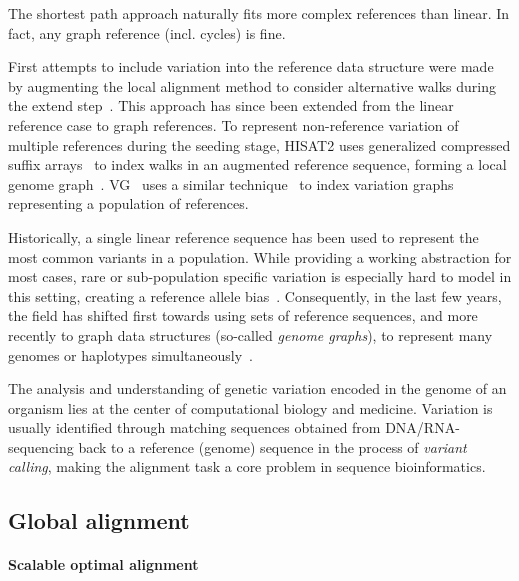 The shortest path approach naturally fits more complex references than linear.
In fact, any graph reference (incl. cycles) is fine.

First attempts to include variation into the reference data structure were made
by augmenting the local alignment method to consider alternative walks during the
extend step~\cite{schneeberger_simultaneous_2009,palmapper}. This approach has
since been extended from the linear reference case to graph references. To
represent non-reference variation of multiple references during the seeding
stage, HISAT2 uses generalized compressed suffix
arrays~\cite{siren_indexing_2014} to index walks in an augmented reference
sequence, forming a local genome graph~\cite{kim_graphbased_2019}.
VG~\cite{garrison_variation_2018} uses a similar
technique~\cite{siren_indexing_2017} to index variation graphs representing a
population of references.

Historically, a single linear reference sequence has been used to represent the
most common variants in a population. While providing a working abstraction for
most cases, rare or sub-population specific variation is especially hard to
model in this setting, creating a reference allele
bias~\cite{stevenson_sources_2013,brandt_mapping_2015}. Consequently, in the
last few years, the field has shifted first towards using sets of reference
sequences, and more recently to graph data structures (so-called {\em genome
graphs}), to represent many genomes or haplotypes
simultaneously~\cite{dilthey_improved_2015,paten_genome_2017,garrison_variation_2018}.

The analysis and understanding of genetic variation encoded in the genome of an
organism lies at the center of computational biology and medicine. Variation is
usually identified through matching sequences obtained from DNA/RNA-sequencing
back to a reference (genome) sequence in the process of \emph{variant calling},
making the alignment task a core problem in sequence bioinformatics.

\subsection*{Global alignment}
%

\label{TRIEsec:task}

\paragraph{Scalable optimal alignment}
